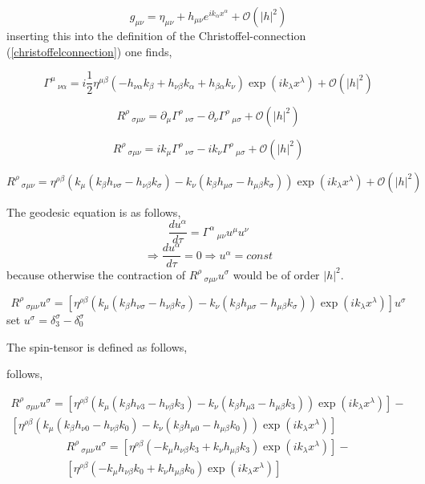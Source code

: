 \documentclass[12pt,a4paper]{article}
\begin{document}
	$$
	g_{\mu \nu } = \eta_{\mu \nu } + h_{\mu \nu }e^{i k_\alpha x^\alpha} + \mathcal{O}(|h|^2)
	$$
	inserting this into the definition of the Christoffel-connection (\ref{christoffelconnection}) one finds,
	
	$$
	\Gamma^{\mu}\,_{\nu \alpha} = i\frac{1}{2}\eta^{\mu \beta}  \left(-h_{\nu \alpha} k_{\beta}+h_{\nu \beta} k_{\alpha}+h_{\beta \alpha} k_{\nu}\right)  \exp\left(i k_{\lambda} x^{\lambda}\right) +  \mathcal{O}(|h|^2)
	$$
	
	
	$$
	R^{\rho}\,_{\sigma \mu \nu} = \partial_\mu \Gamma^{\rho}\,_{\nu \sigma} - \partial_\nu \Gamma^{\rho}\,_{\mu \sigma} + \mathcal{O}(|h|^2)
	$$
	
	$$
	R^{\rho}\,_{\sigma \mu \nu} = i k_\mu \Gamma^{\rho}\,_{\nu \sigma} -  i k_\nu \Gamma^{\rho}\,_{\mu \sigma} + \mathcal{O}(|h|^2)
	$$
	
	$$
	R^{\rho}\,_{\sigma \mu \nu} = \eta^{\rho \beta}\left(k_\mu \left(k_\beta h_{\nu \sigma} - h_{\nu \beta}  k_\sigma \right) - k_\nu \left( k_\beta h_{\mu \sigma} - h_{\mu \beta}  k_\sigma\right) \right) \exp\left(i k_{\lambda} x^{\lambda}\right)  + \mathcal{O}(|h|^2)
	$$
	
	The geodesic equation is as follows,
	$$
	\frac{du^\alpha}{d \tau} = \Gamma^{\alpha}\,_{\mu \nu}u^\mu u^\nu
	$$
	$$%
	\Rightarrow
	\frac{du^\alpha}{d \tau} = 0
	\Rightarrow u^\alpha = const
	$$
	because otherwise the contraction of $R^{\rho}\,_{\sigma \mu \nu}u^\sigma$ would be of order $|h|^2$.
	
	$$
	R^{\rho}\,_{\sigma \mu \nu}u^\sigma = \left[\eta^{\rho \beta}\left(k_\mu \left(k_\beta h_{\nu \sigma} - h_{\nu \beta}  k_\sigma \right) - k_\nu \left( k_\beta h_{\mu \sigma} - h_{\mu \beta}  k_\sigma\right) \right) \exp\left(i k_{\lambda} x^{\lambda}\right)\right] u^\sigma
	$$
	set $u^\sigma = \delta^\sigma_3 - \delta^\sigma_0$
	
	The spin-tensor is defined as follows,
	
	follows,
	
	\begin{multline}
		R^{\rho}\,_{\sigma \mu \nu}u^\sigma = \left[\eta^{\rho \beta}\left(k_\mu \left(k_\beta h_{\nu 3} - h_{\nu \beta}  k_3
		 \right) - k_\nu \left( k_\beta h_{\mu 3} - h_{\mu \beta}  k_3 \right) \right) \exp\left(i k_{\lambda} x^{\lambda}\right)\right] - \\
		\left[\eta^{\rho \beta}\left(k_\mu \left(k_\beta h_{\nu 0} - h_{\nu \beta}  k_0 \right) - k_\nu \left( k_\beta h_{\mu 0} - h_{\mu \beta}  k_0\right) \right) \exp\left(i k_{\lambda} x^{\lambda}\right)\right] 
	\end{multline}
	\begin{multline}
		R^{\rho}\,_{\sigma \mu \nu}u^\sigma = \left[\eta^{\rho \beta}\left(- k_\mu  h_{\nu \beta}  k_3 + k_\nu h_{\mu \beta}  k_3  \right) \exp\left(i k_{\lambda} x^{\lambda}\right)\right] - \\
		\left[\eta^{\rho \beta}\left( - k_\mu  h_{\nu \beta}  k_0 + k_\nu  h_{\mu \beta}  k_0 \right) \exp\left(i k_{\lambda} x^{\lambda}\right)\right] 
	\end{multline}
\end{document}

